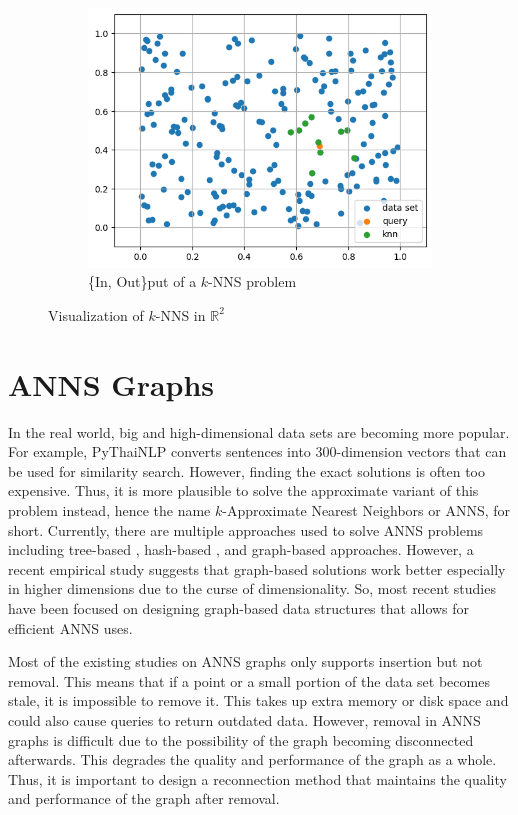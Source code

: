 \begin{figure}[ht]
\begin{subfigure}{0.32\textwidth}
        \includegraphics[width=\textwidth]{images/sim-search-final.png}
        \caption{\{In, Out\}put of a \(k\)-NNS problem}
    \end{subfigure}
    \hfill
    \caption{Visualization of \(k\)-NNS in \(\mathbb{R}^2\)}
\end{figure}

\section{ANNS Graphs}

In the real world, big and high-dimensional data sets are becoming more popular. For example, PyThaiNLP converts sentences into 300-dimension vectors that can be used for similarity search. However, finding the exact solutions is often too expensive. Thus, it is more plausible to solve the approximate variant of this problem instead, hence the name \(k\)-Approximate Nearest Neighbors or ANNS, for short. 
Currently, there are multiple approaches used to solve ANNS problems including tree-based \cite{tree-hdindex,tree-optkd}, hash-based \cite{hash-idec,hash-qalsh}, and graph-based \cite{nsg,diskann-paper,hnsw} approaches. However, a recent empirical study \cite{survey2} suggests that graph-based solutions work better especially in higher dimensions due to the curse of dimensionality. So, most recent studies have been focused on designing graph-based data structures that allows for efficient ANNS uses.

Most of the existing studies on ANNS graphs only supports insertion but not removal. This means that if a point or a small portion of the data set becomes stale, it is impossible to remove it. This takes up extra memory or disk space and could also cause queries to return outdated data.
However, removal in ANNS graphs is difficult due to the possibility of the graph becoming disconnected afterwards. This degrades the quality and performance of the graph as a whole. Thus, it is important to design a reconnection method that maintains the quality and performance of the graph after removal.

